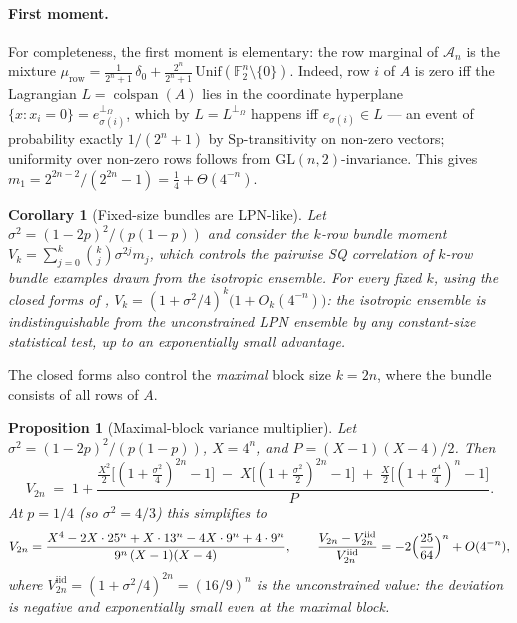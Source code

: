 \documentclass[11pt,a4paper]{article}
\theoremstyle{plain}
\newtheorem{corollary}[theorem]{Corollary}
\newtheorem{proposition}[theorem]{Proposition}
\theoremstyle{definition}
\newcommand{\F}{\mathbb{F}}
\begin{document}
\paragraph{First moment.} For completeness, the first moment is elementary: the row marginal of $\mathcal{A}_n$ is the mixture $\mu_{\mathrm{row}} = \tfrac{1}{2^n+1}\,\delta_0 + \tfrac{2^n}{2^n+1}\,\mathrm{Unif}(\F_2^n \setminus \{0\})$. Indeed, row $i$ of $A$ is zero iff the Lagrangian $L = \operatorname{colspan}(A)$ lies in the coordinate hyperplane $\{x : x_i = 0\} = e_{\sigma(i)}^{\perp_\Omega}$, which by $L = L^{\perp_\Omega}$ happens iff $e_{\sigma(i)} \in L$ --- an event of probability exactly $1/(2^n+1)$ by $\mathrm{Sp}$-transitivity on non-zero vectors; uniformity over non-zero rows follows from $\mathrm{GL}(n,2)$-invariance. This gives $m_1 = 2^{2n-2}/(2^{2n}-1) = \tfrac14 + \Theta(4^{-n})$.

\begin{corollary}[Fixed-size bundles are LPN-like]
\label{cor:bundle}
Let $\sigma^2 = (1-2p)^2/(p(1-p))$ and consider the $k$-row bundle moment
$V_k = \sum_{j=0}^{k}\binom{k}{j}\sigma^{2j} m_j$, which controls the pairwise SQ correlation of $k$-row bundle examples drawn from the isotropic ensemble. For every fixed $k$, using the closed forms of ,
$V_k = (1+\sigma^2/4)^k\bigl(1 + O_k(4^{-n})\bigr)$:
the isotropic ensemble is indistinguishable from the unconstrained LPN ensemble by any constant-size statistical test, up to an exponentially small advantage.
\end{corollary}

The closed forms also control the \emph{maximal} block size $k = 2n$, where the bundle consists of all rows of $A$.

\begin{proposition}[Maximal-block variance multiplier]
\label{prop:vmax}
Let $\sigma^2 = (1-2p)^2/(p(1-p))$, $X = 4^n$, and $P = (X-1)(X-4)/2$. Then
\[
V_{2n} \;=\; 1 + \frac{\tfrac{X^2}{2}\bigl[(1+\tfrac{\sigma^2}{4})^{2n}-1\bigr] \;-\; X\bigl[(1+\tfrac{\sigma^2}{2})^{2n}-1\bigr] \;+\; \tfrac{X}{2}\bigl[(1+\tfrac{\sigma^4}{4})^{n}-1\bigr]}{P}.
\]
At $p = 1/4$ (so $\sigma^2 = 4/3$) this simplifies to
\[
V_{2n} = \frac{X^4 - 2X\cdot 25^n + X\cdot 13^n - 4X\cdot 9^n + 4\cdot 9^n}{9^n\,(X-1)(X-4)},
\qquad
\frac{V_{2n}-V_{2n}^{\mathrm{iid}}}{V_{2n}^{\mathrm{iid}}} = -2\Bigl(\frac{25}{64}\Bigr)^{n} + O(4^{-n}),
\]
where $V_{2n}^{\mathrm{iid}} = (1+\sigma^2/4)^{2n} = (16/9)^n$ is the unconstrained value: the deviation is \emph{negative} and exponentially small even at the maximal block.
\end{proposition}
\end{document}
